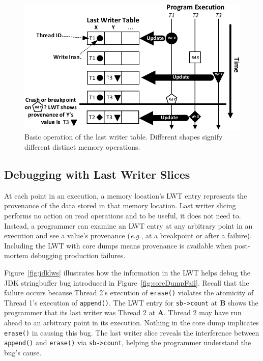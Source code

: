 \documentclass[preprint,10pt]{sigplanconf}
\newcommand{\lwt}{LWT\xspace}
\begin{document}
\begin{figure}[h]
\centering
\includegraphics[scale=.6]{figs/BasicLWT.pdf}
\caption{\label{fig:basicLWT}Basic operation of the last writer table. Different shapes signify different distinct memory operations. }
\end{figure}


\subsection{Debugging with Last Writer Slices}
\label{sec:debugging}

At each point in an execution, a memory location's \lwt entry represents the
provenance of the data stored in that memory location.   Last writer slicing
performs no action on read operations and to be useful, it does not need to.
Instead, a programmer can examine an \lwt entry at any arbitrary point in an
execution and see a value's
provenance ({\em e.g.}, at a breakpoint or after a failure).  Including the \lwt with core dumps means provenance is available
when post-mortem debugging production failures.

Figure~\ref{fig:jdklws} illustrates how the information in the \lwt helps debug
the JDK stringbuffer bug introduced in Figure~\ref{fig:coreDumpFail}.  Recall
that the failure occurs because Thread 2's execution of {\tt erase()} violates
the atomicity of Thread 1's execution of {\tt append()}.  The \lwt entry for
{\tt sb->count} at {\bf B} shows the programmer that its last writer was Thread
2 at {\bf A}. Thread 2 may have run ahead to an arbitrary point in its
execution.  Nothing in the core dump implicates {\tt erase()} in causing
this bug.  The last writer slice reveals the interference between {\tt append()}
and {\tt erase()} via {\tt sb->count}, helping the programmer understand the
bug's cause.
\end{document}
